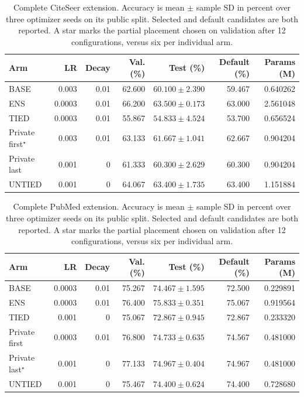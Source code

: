 \begin{table}[t]
\centering\small
\caption{Complete CiteSeer extension. Accuracy is mean $\pm$ sample SD in percent over three optimizer seeds on its public split. Selected and default candidates are both reported. A star marks the partial placement chosen on validation after 12 configurations, versus six per individual arm.}
\label{tab:confirmation-citeseer}
\setlength{\tabcolsep}{4pt}
\begin{tabular}{lrrrrrr}
\toprule
Arm & LR & Decay & Val. (\%) & Test (\%) & Default (\%) & Params (M)\\
\midrule
BASE & 0.003 & 0.01 & 62.600 & $60.100 \pm 2.390$ & 59.467 & 0.640262\\
ENS & 0.0003 & 0.01 & 66.200 & $63.500 \pm 0.173$ & 63.000 & 2.561048\\
TIED & 0.0003 & 0.01 & 55.867 & $54.833 \pm 4.524$ & 53.700 & 0.656524\\
Private first$^{\star}$ & 0.003 & 0.01 & 63.133 & $61.667 \pm 1.041$ & 62.667 & 0.904204\\
Private last & 0.001 & 0 & 61.333 & $60.300 \pm 2.629$ & 60.300 & 0.904204\\
UNTIED & 0.001 & 0 & 64.067 & $63.400 \pm 1.735$ & 63.400 & 1.151884\\
\bottomrule
\end{tabular}
\end{table}

\begin{table}[t]
\centering\small
\caption{Complete PubMed extension. Accuracy is mean $\pm$ sample SD in percent over three optimizer seeds on its public split. Selected and default candidates are both reported. A star marks the partial placement chosen on validation after 12 configurations, versus six per individual arm.}
\label{tab:confirmation-pubmed}
\setlength{\tabcolsep}{4pt}
\begin{tabular}{lrrrrrr}
\toprule
Arm & LR & Decay & Val. (\%) & Test (\%) & Default (\%) & Params (M)\\
\midrule
BASE & 0.0003 & 0.01 & 75.267 & $74.467 \pm 1.595$ & 72.500 & 0.229891\\
ENS & 0.0003 & 0.01 & 76.400 & $75.833 \pm 0.351$ & 75.067 & 0.919564\\
TIED & 0.001 & 0 & 75.067 & $72.867 \pm 0.945$ & 72.867 & 0.233320\\
Private first & 0.0003 & 0.01 & 76.800 & $74.733 \pm 0.635$ & 74.567 & 0.481000\\
Private last$^{\star}$ & 0.001 & 0 & 77.133 & $74.967 \pm 0.404$ & 74.967 & 0.481000\\
UNTIED & 0.001 & 0 & 75.467 & $74.400 \pm 0.624$ & 74.400 & 0.728680\\
\bottomrule
\end{tabular}
\end{table}

